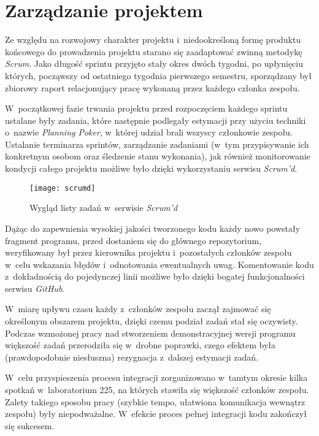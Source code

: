 \section{Zarządzanie projektem}

Ze względu na rozwojowy charakter projektu i~niedookreśloną formę produktu
końcowego do prowadzenia projektu starano się zaadaptować zwinną metodykę
\emph{Scrum}.
Jako długość sprintu przyjęto stały okres dwóch tygodni, po upłynięciu których,
począwszy od ostatniego tygodnia pierwszego semestru, sporządzany był zbiorowy
raport relacjonujący pracę wykonaną przez każdego członka zespołu.

W~początkowej fazie trwania projektu przed rozpoczęciem każdego sprintu
ustalane były zadania, które następnie podlegały estymacji przy użyciu techniki
o~nazwie \emph{Planning Poker}, w~której udział brali wszyscy członkowie
zespołu.
Ustalanie terminarza sprintów, zarządzanie zadaniami (w~tym przypisywanie
ich konkretnym osobom oraz śledzenie stanu wykonania), jak również
monitorowanie kondycji całego projektu możliwe było dzięki wykorzystaniu
serwisu \emph{Scrum'd}.

\begin{figure}[ht]
	\centering
		\texttt{[image: scrumd]}
	\caption{Wygląd listy zadań w~serwisie \emph{Scrum'd}}
	\label{fig:scrumd}
\end{figure}

Dążąc do zapewnienia wysokiej jakości tworzonego kodu każdy nowo powstały
fragment programu, przed dostaniem się do głównego repozytorium, weryfikowany
był przez kierownika projektu i~pozostałych członków zespołu w~celu wskazania
błędów i~odnotowania ewentualnych uwag. Komentowanie kodu z~dokładnością do
pojedynczej linii możliwe było dzięki bogatej funkcjonalności serwisu
\emph{GitHub}.

W~miarę upływu czasu każdy z~członków zespołu zaczął zajmować się określonym
obszarem projektu, dzięki czemu podział zadań stał się oczywisty. Podczas
wzmożonej pracy nad stworzeniem demonstracyjnej wersji programu większość zadań
przerodziła się w~drobne poprawki, czego efektem była (prawdopodobnie
niesłuszna) rezygnacja z~dalszej estymacji zadań.

W~celu przyspieszenia procesu integracji zorganizowano w~tamtym okresie kilka
spotkań w~laboratorium 225, na których stawiła się większość członków zespołu.
Zalety takiego sposobu pracy (szybkie tempo, ułatwiona komunikacja wewnątrz
zespołu) były niepodważalne. W~efekcie proces pełnej integracji kodu
zakończył się sukcesem.

